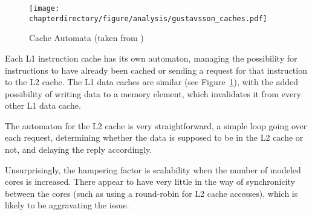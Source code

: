 \begin{figure}[hbt!]
\begin{center}
\texttt{[image: \\chapterdirectory/figure/analysis/gustavsson\_caches.pdf]}
\end{center}
\caption{Cache Automata (taken from \cite{conf/wcet/GustavssonELP10})}%
\label{fig:formal_analysis:gustavsson_caches}
\end{figure}

Each L1 instruction cache has its own automaton, managing the possibility for
instructions to have already been cached or sending a request for that
instruction to the L2 cache. The L1 data caches are similar (see
Figure~\ref{fig:formal_analysis:gustavsson_caches}), with the added possibility
of writing data to a memory element, which invalidates it from every other L1
data cache.

The automaton for the L2 cache is very straightforward, a simple loop going
over each request, determining whether the data is supposed to be in the L2
cache or not, and delaying the reply accordingly.

\iffalse
An extra automaton is also provided, which acts as a mutex for use in modeling
the programs.
\fi

Unsurprisingly, the hampering factor is scalability when the number of modeled
cores is increased. There appear to have very little in the way of synchronicity
between the cores (such as using a round-robin for L2 cache accesses), which
is likely to be aggravating the issue.
\stopallthesefloats
